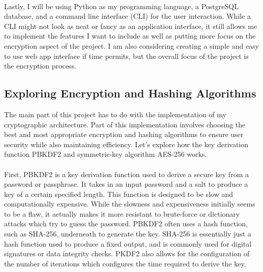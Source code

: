 \documentclass[10pt,twocolumn]{article}
\begin{document}
\paragraph{}
Lastly, I will be using Python as my programming language, a PostgreSQL database, and a command line interface (CLI) for the user interaction. While a CLI might not look as neat or fancy as an application interface, it still allows me to implement the features I want to include as well as putting more focus on the encryption aspect of the project. I am also considering creating a simple and easy to use web app interface if time permits, but the overall focus of the project is the encryption process.
\subsection{Exploring Encryption and Hashing Algorithms}
The main part of this project has to do with the implementation of my cryptographic architecture. Part of this implementation involves choosing the best and most appropriate encryption and hashing algorithms to ensure user security while also maintaining efficiency. Let's explore how the key derivation function PBKDF2 and symmetric-key algorithm AES-256 works.
\paragraph{}
First, PBKDF2 is a key derivation function used to derive a secure key from a password or passphrase. It takes in an input password and a salt to produce a key of a certain specified length. This function is designed to be slow and computationally expensive. While the slowness and expensiveness initially seems to be a flaw, it actually makes it more resistant to brute-force or dictionary attacks which try to guess the password. PBKDF2 often uses a hash function, such as SHA-256, underneath to generate the key. SHA-256 is essentially just a hash function used to produce a fixed output, and is commonly used for digital signatures or data integrity checks. PKDF2 also allows for the configuration of the number of iterations which configures the time required to derive the key.
\end{document}
